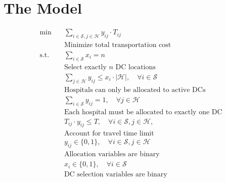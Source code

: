 \documentclass{article}
\begin{document}
\section{The Model}
\begin{align*}
    \min \quad & \sum_{i \in \mathcal{S}, j \in \mathcal{H}} y_{ij} \cdot T_{ij} \\
    & \text{Minimize total transportation cost} \\[6pt]
    \text{s.t.} \quad & \sum_{i \in \mathcal{S}} x_i = n \\
    & \text{Select exactly } n \text{ DC locations} \\[6pt]
    & \sum_{j \in \mathcal{H}} y_{ij} \leq x_i \cdot |\mathcal{H}|, \quad \forall i \in \mathcal{S} \\
    & \text{Hospitals can only be allocated to active DCs} \\[6pt]
    & \sum_{i \in \mathcal{S}} y_{ij} = 1, \quad \forall j \in \mathcal{H} \\
    & \text{Each hospital must be allocated to exactly one DC} \\[6pt]& T_{ij} \cdot y_{ij} \leq T, \quad \forall i \in \mathcal{S}, j \in \mathcal{H},\\
    & \text{Account for travel time limit}\\[6pt]
    & y_{ij} \in \{0,1\}, \quad \forall i \in \mathcal{S}, j \in \mathcal{H} \\
    & \text{Allocation variables are binary} \\[6pt]
    & x_i \in \{0,1\}, \quad \forall i \in \mathcal{S} \\
    & \text{DC selection variables are binary}
\end{align*}
\end{document}
